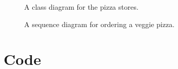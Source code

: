 \begin{figure}[hp!]
  \centering
  \caption{\label{Figure::pizzastorediagram} A class diagram for the pizza stores.}
\end{figure}

\begin{figure}[hp!]
  \centering
  \caption{\label{Figure::pizzaseqdiagram} A sequence diagram for ordering a veggie pizza.}
\end{figure}

\pagebreak

\section{Code}


